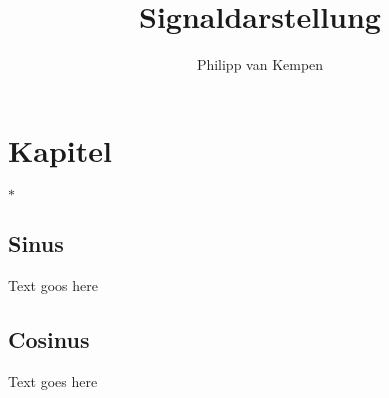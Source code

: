 \documentclass[german]{latex4ei/latex4ei_sheet}
\title{Signaldarstellung}
\author{Philipp van Kempen}					%
\begin{document}
\maketitle   %


\section{Kapitel}
$\ast$

\begin{sectionbox}
	\subsection{Sinus}
	
	Text goos here 
	
	
\end{sectionbox}


\begin{sectionbox}
	\subsection{Cosinus}
	
	Text goes here
	
	
\end{sectionbox}





\end{document}
